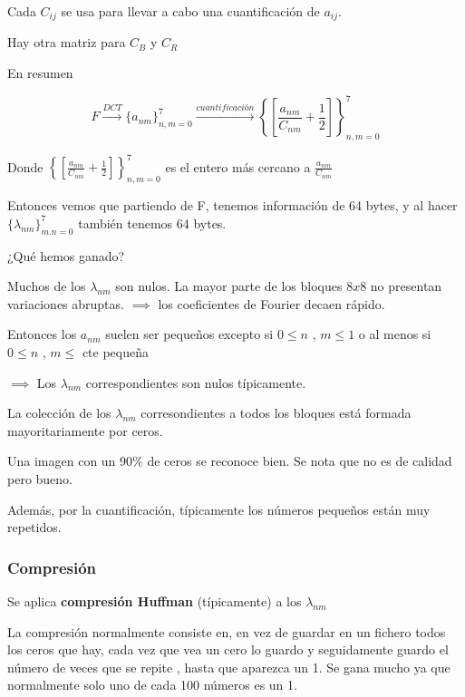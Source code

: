 			Cada $C_{ij}$ se usa para llevar a cabo una cuantificación de $a_{ij}$.

			Hay otra matriz para $C_B$ y $C_R$

			\begin{framed}
				En resumen

				$$ F \xrightarrow{DCT} \{ a_{nm} \}^{7}_{n,m = 0} \xrightarrow{cuantificación} \left\{ \left[ \frac{a_{nm}}{C_{nm}} + \frac{1}{2} \right] \right\}^{7}_{n,m = 0} $$

				Donde $\left\{ \left[ \frac{a_{nm}}{C_{nm}} + \frac{1}{2} \right] \right\}^{7}_{n,m = 0}$ es el entero más cercano a $\frac{a_{nm}}{C_{nm}}$
			\end{framed}


			Entonces vemos que partiendo de F, tenemos información de 64 bytes, y al hacer $\{\lambda_{nm}\}^7_{m.n=0}$ también tenemos 64 bytes.

			¿Qué hemos ganado?

			Muchos de los $\lambda_{nm}$ son nulos.
			La mayor parte de los bloques $8x8$ no presentan variaciones abruptas. $\implies$ los coeficientes de Fourier decaen rápido.

			Entonces los $a_{nm}$ suelen ser pequeños excepto si $0 \leq n$ , $m \leq 1$ o al menos si $0 \leq n$ , $m \leq$ cte pequeña

			$\implies$ Los $\lambda_{nm}$ correspondientes son nulos típicamente.

			La colección de los $\lambda_{nm}$ corresondientes a todos los bloques está formada mayoritariamente por ceros.

			\begin{example}
				Una imagen con un  $90\%$ de ceros se reconoce bien. Se nota que no es de calidad pero bueno.
			\end{example}

			Además, por la cuantificación, típicamente los números pequeños están muy repetidos.

		\subsubsection{Compresión}
			Se aplica \textbf{compresión Huffman} (típicamente) a los $\lambda_{nm}$

			La compresión normalmente consiste en, en vez de guardar en un fichero todos los ceros que hay, cada vez que vea un cero lo guardo y seguidamente guardo el número de veces que se repite , hasta que aparezca un 1. Se gana mucho ya que normalmente solo uno de cada 100 números es un 1.

